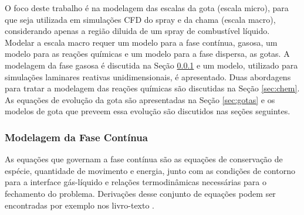 O foco deste trabalho é na modelagem das escalas da gota (escala micro), para que seja utilizada em simulações CFD do spray e da chama (escala macro), considerando apenas a região diluida de um spray de combustível líquido.
Modelar a escala macro requer um modelo para a fase contínua, gasosa, um modelo para as reações químicas e um modelo para a fase dispersa, as gotas.
A modelagem da fase gasosa é discutida na Seção \ref{sec:gas} e um modelo, utilizado para simulações laminares reativas unidimensionais, é apresentado.
Duas abordagens para tratar a modelagem das reações químicas são discutidas na Seção \ref{sec:chem}.
As equações de evolução da gota são apresentadas na Seção \ref{sec:gotas} e os modelos de gota que preveem essa evolução são discutidos nas seções seguintes.





\subsubsection{Modelagem da Fase Contínua} \label{sec:gas}

As equações que governam a fase contínua são as equações de conservação de espécie, quantidade de movimento e energia, junto com as condições de contorno para a interface gás-líquido e relações termodinâmicas necessárias para o fechamento do problema.
Derivações desse conjunto de equações podem ser encontradas por exemplo nos livro-texto \cite{Williams1985,Kuo2005,Law2006,Glassman2008}.

